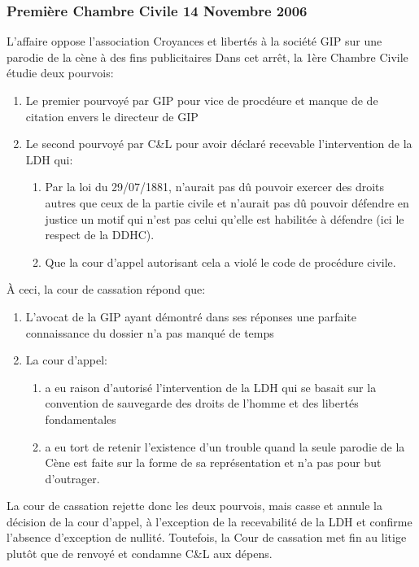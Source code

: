 \documentclass[math]{cours}
\begin{document}
\subsubsection{Première Chambre Civile 14 Novembre 2006}
L'affaire \cite{CassCiv114111006} oppose l'association Croyances et libertés à la société GIP sur une parodie de la cène à des fins publicitaires
Dans cet arrêt, la 1ère Chambre Civile étudie deux pourvois:
\begin{enumerate}
	\item Le premier pourvoyé par GIP pour vice de procdéure et manque de de citation envers le directeur de GIP
	\item Le second pourvoyé par C\&L pour avoir déclaré recevable l'intervention de la LDH qui:
		\begin{enumerate}
			\item Par la loi du 29/07/1881, n'aurait pas dû pouvoir exercer des droits autres que ceux de la partie civile et n'aurait pas dû pouvoir défendre en justice un motif qui n'est pas celui qu'elle est habilitée à défendre (ici le respect de la DDHC).
			\item Que la cour d'appel autorisant cela a violé le code de procédure civile.
		\end{enumerate}
\end{enumerate}
À ceci, la cour de cassation répond que:
\begin{enumerate}
	\item L'avocat de la GIP ayant démontré dans ses réponses une parfaite connaissance du dossier n'a pas manqué de temps
	\item La cour d'appel:
		\begin{enumerate}
			\item a eu raison d'autorisé l'intervention de la LDH qui se basait sur la convention de sauvegarde des droits de l'homme et des libertés fondamentales
			\item a eu tort de retenir l'existence d'un trouble quand la seule parodie de la Cène est faite sur la forme de sa représentation et n'a pas pour but d'outrager.
		\end{enumerate}
\end{enumerate}
La cour de cassation rejette donc les deux pourvois, mais casse et annule la décision de la cour d'appel, à l'exception de la recevabilité de la LDH et confirme l'absence d'exception de nullité.
Toutefois, la Cour de cassation met fin au litige plutôt que de renvoyé et condamne C\&L aux dépens.

\medskip
\end{document}
